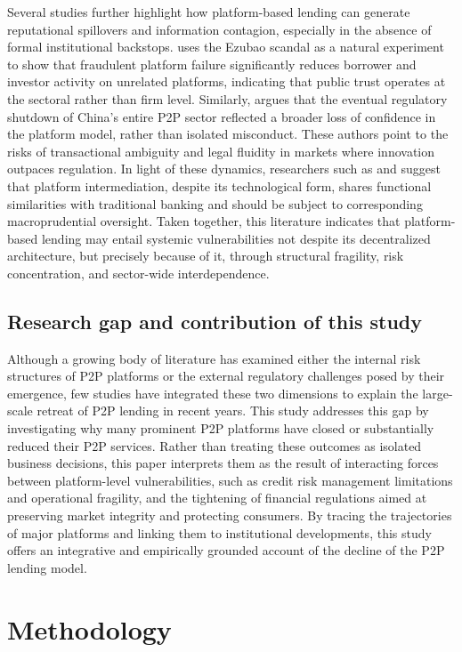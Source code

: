 \documentclass[pdflatex,sn-apa]{sn-jnl}%
\theoremstyle{thmstyleone}%
\theoremstyle{thmstyletwo}%
\theoremstyle{thmstylethree}%
\begin{document}
Several studies further highlight how platform-based lending can generate reputational spillovers and information contagion, especially in the absence of formal institutional backstops. \citet{Cheng2022} uses the Ezubao scandal as a natural experiment to show that fraudulent platform failure significantly reduces borrower and investor activity on unrelated platforms, indicating that public trust operates at the sectoral rather than firm level. Similarly, \citet{Chen2021} argues that the eventual regulatory shutdown of China’s entire P2P sector reflected a broader loss of confidence in the platform model, rather than isolated misconduct. These authors point to the risks of transactional ambiguity and legal fluidity in markets where innovation outpaces regulation. In light of these dynamics, researchers such as \citet{Wei20161} and \citet{Thakor2020} suggest that platform intermediation, despite its technological form, shares functional similarities with traditional banking and should be subject to corresponding macroprudential oversight. Taken together, this literature indicates that platform-based lending may entail systemic vulnerabilities not despite its decentralized architecture, but precisely because of it, through structural fragility, risk concentration, and sector-wide interdependence.

\subsection{Research gap and contribution of this study}
Although a growing body of literature has examined either the internal risk structures of P2P platforms or the external regulatory challenges posed by their emergence, few studies have integrated these two dimensions to explain the large-scale retreat of P2P lending in recent years. This study addresses this gap by investigating why many prominent P2P platforms have closed or substantially reduced their P2P services. Rather than treating these outcomes as isolated business decisions, this paper interprets them as the result of interacting forces between platform-level vulnerabilities, such as credit risk management limitations and operational fragility, and the tightening of financial regulations aimed at preserving market integrity and protecting consumers. By tracing the trajectories of major platforms and linking them to institutional developments, this study offers an integrative and empirically grounded account of the decline of the P2P lending model.

\section{Methodology}
\end{document}
